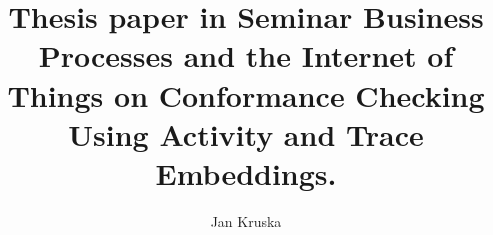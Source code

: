 \documentclass[runningheads]{template/llncs}
\begin{document}
%
\title{Thesis paper in Seminar Business Processes and the Internet of Things on Conformance Checking Using Activity and Trace Embeddings.}
%
%
\author{Jan Kruska}
%
%
%
\maketitle              %
%
\begin{abstract}
\end{abstract}
%
%
%
\end{document}
